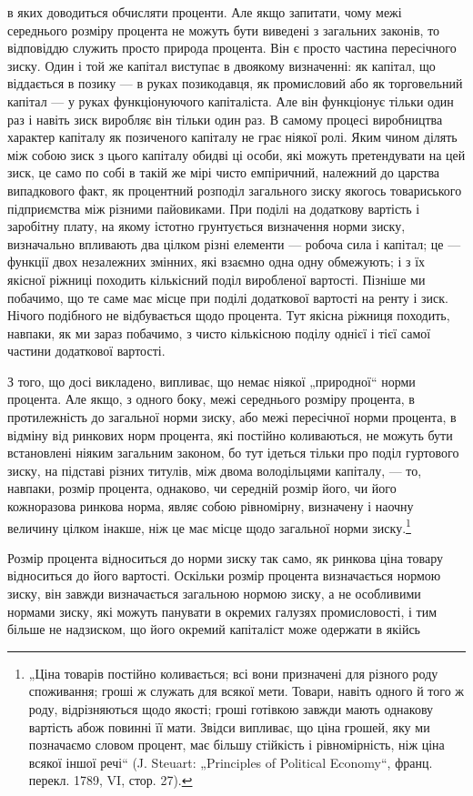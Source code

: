 \parcont{}  %
в яких доводиться обчисляти проценти. Але якщо запитати, чому
межі середнього розміру процента не можуть бути виведені
з загальних законів, то відповіддю служить просто природа процента.
Він є просто частина пересічного зиску. Один і той же
капітал виступає в двоякому визначенні: як капітал, що віддається
в позику — в руках позикодавця, як промисловий або як
торговельний капітал — у руках функціонуючого капіталіста. Але
він функціонує тільки один раз і навіть зиск виробляє він тільки
один раз. В самому процесі виробництва характер капіталу як
позиченого капіталу не грає ніякої ролі. Яким чином ділять
між собою зиск з цього капіталу обидві ці особи, які можуть
претендувати на цей зиск, це само по собі в такій же мірі чисто
емпіричний, належний до царства випадкового факт, як процентний
розподіл загального зиску якогось товариського підприємства
між різними пайовиками. При поділі на додаткову вартість
і заробітну плату, на якому істотно грунтується визначення
норми зиску, визначально впливають два цілком різні елементи —
робоча сила і капітал; це — функції двох незалежних змінних, які
взаємно одна одну обмежують; і з їх якісної ріжниці походить
кількісний поділ виробленої вартості. Пізніше ми побачимо, що
те саме має місце при поділі додаткової вартості на ренту і зиск.
Нічого подібного не відбувається щодо процента. Тут якісна
ріжниця походить, навпаки, як ми зараз побачимо, з чисто кількісною
поділу однієї і тієї самої частини додаткової вартості.

З того, що досі викладено, випливає, що немає ніякої „природної“
норми процента. Але якщо, з одного боку, межі середнього
розміру процента, в протилежність до загальної норми зиску,
або межі пересічної норми процента, в відміну від ринкових
норм процента, які постійно коливаються, не можуть бути встановлені
ніяким загальним законом, бо тут ідеться тільки про
поділ гуртового зиску, на підставі різних титулів, між двома володільцями
капіталу, — то, навпаки, розмір процента, однаково,
чи середній розмір його, чи його кожноразова ринкова норма,
являє собою рівномірну, визначену і наочну величину цілком
інакше, ніж це має місце щодо загальної норми зиску.\footnote{
„Ціна товарів постійно коливається; всі вони призначені для різного роду
споживання; гроші ж служать для всякої мети. Товари, навіть одного й того ж
роду, відрізняються щодо якості; гроші готівкою завжди мають однакову вартість
абож повинні її мати. Звідси випливає, що ціна грошей, яку ми позначаємо
словом процент, має більшу стійкість і рівномірність, ніж ціна всякої
іншої речі“ (J. Steuart: „Principles of Political Economy“, франц. перекл. 1789,
VI, стор. 27).
}

Розмір процента відноситься до норми зиску так само, як ринкова
ціна товару відноситься до його вартості. Оскільки розмір
процента визначається нормою зиску, він завжди визначається
загальною нормою зиску, а не особливими нормами зиску, які
можуть панувати в окремих галузях промисловості, і тим більше
не надзиском, що його окремий капіталіст може одержати в якійсь
\parbreak{}  %
